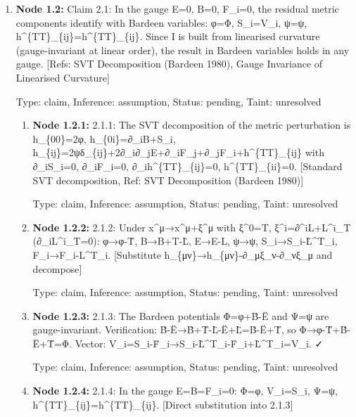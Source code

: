 \documentclass{article}
\begin{document}
\begin{enumerate}
\begin{enumerate}
  Type: claim, Inference: assumption, Status: pending, Taint: unresolved

\end{enumerate}
\item \textbf{Node 1.2:} Claim 2.1: In the gauge E=0, B=0, F\_i=0, the residual metric components identify with Bardeen variables: φ=Φ, S\_i=V\_i, ψ=ψ, h\textasciicircum{}\{TT\}\_\{ij\}=h\textasciicircum{}\{TT\}\_\{ij\}. Since I is built from linearised curvature (gauge-invariant at linear order), the result in Bardeen variables holds in any gauge. [Refs: SVT Decomposition (Bardeen 1980), Gauge Invariance of Linearised Curvature]

  Type: claim, Inference: assumption, Status: pending, Taint: unresolved

\begin{enumerate}
\item \textbf{Node 1.2.1:} 2.1.1: The SVT decomposition of the metric perturbation is h\_\{00\}=2φ, h\_\{0i\}=∂\_iB+S\_i, h\_\{ij\}=2ψδ\_\{ij\}+2∂\_i∂\_jE+∂\_iF\_j+∂\_jF\_i+h\textasciicircum{}\{TT\}\_\{ij\} with ∂\_iS\_i=0, ∂\_iF\_i=0, ∂\_ih\textasciicircum{}\{TT\}\_\{ij\}=0, h\textasciicircum{}\{TT\}\_\{ii\}=0. [Standard SVT decomposition, Ref: SVT Decomposition (Bardeen 1980)]

  Type: claim, Inference: assumption, Status: pending, Taint: unresolved

\item \textbf{Node 1.2.2:} 2.1.2: Under x\textasciicircum{}μ→x\textasciicircum{}μ+ξ\textasciicircum{}μ with ξ\textasciicircum{}0=T, ξ\textasciicircum{}i=∂\textasciicircum{}iL+L\textasciicircum{}i\_T (∂\_iL\textasciicircum{}i\_T=0): φ→φ-Ṫ, B→B+T-L̇, E→E-L, ψ→ψ, S\_i→S\_i-L̇\textasciicircum{}T\_i, F\_i→F\_i-L\textasciicircum{}T\_i. [Substitute h\_\{μν\}→h\_\{μν\}-∂\_μξ\_ν-∂\_νξ\_μ and decompose]

  Type: claim, Inference: assumption, Status: pending, Taint: unresolved

\item \textbf{Node 1.2.3:} 2.1.3: The Bardeen potentials Φ=φ+Ḃ-Ë and Ψ=ψ are gauge-invariant. Verification: Ḃ-Ë→Ḃ+Ṫ-L̈-Ë+L̈=Ḃ-Ë+Ṫ, so Φ→φ-Ṫ+Ḃ-Ë+Ṫ=Φ. Vector: V\_i=S\_i-Ḟ\_i→S\_i-L̇\textasciicircum{}T\_i-Ḟ\_i+L̇\textasciicircum{}T\_i=V\_i. ✓

  Type: claim, Inference: assumption, Status: pending, Taint: unresolved

\item \textbf{Node 1.2.4:} 2.1.4: In the gauge E=B=F\_i=0: Φ=φ, V\_i=S\_i, Ψ=ψ, h\textasciicircum{}\{TT\}\_\{ij\}=h\textasciicircum{}\{TT\}\_\{ij\}. [Direct substitution into 2.1.3]


\end{enumerate}
\end{enumerate}
\end{document}
